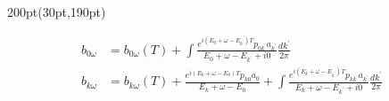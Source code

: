 \begin{frame}
\begin{textblock*}{200pt}(30pt,190pt)
\footnotesize

\begin{align}
b_{0\omega} & = b_{0\omega}(T)
 +\int\frac{e^{i(E_0+\omega-E_{k^\prime})T}p_{0k^\prime}a_{k^\prime}}
{E_0+\omega-E_{k^\prime} + i0} \frac{dk^\prime}{2\pi} \nonumber\\
b_{k\omega} & = b_{k\omega}(T)
 +\frac{e^{i(E_k+\omega-E_0)T}p_{k0}a_0}{E_k+\omega-E_0}
 +\int\frac{e^{i(E_k+\omega-E_{k^\prime})T}p_{kk^\prime}a_{k^\prime}}
{E_k+\omega-E_{k^\prime} + i0} \frac{dk^\prime}{2\pi} \nonumber
\end{align}


\end{textblock*}


\end{frame}






